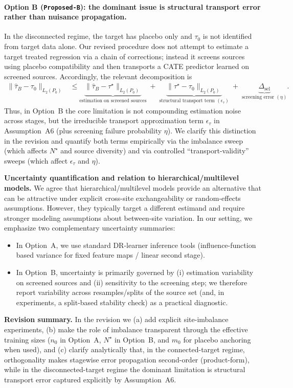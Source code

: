 {\paragraph{Option B (\texttt{Proposed-B}): the dominant issue is structural transport error rather than nuisance propagation.}
In the disconnected regime, the target has placebo only and $\tau_0$ is not identified from target data alone. Our revised procedure does not attempt to estimate a target treated regression via a chain of corrections; instead it screens sources using placebo compatibility and then transports a CATE predictor learned on screened sources. Accordingly, the relevant decomposition is
\begin{align*}
\|\widehat\tau_B-\tau_0\|_{L_2(P_0)}
&\le
\underbrace{\|\widehat\tau_B-\tau^\star\|_{L_2(P_0)}}_{\text{estimation on screened sources}}
\;+\;
\underbrace{\|\tau^\star-\tau_0\|_{L_2(P_0)}}_{\text{structural transport term }(\epsilon_\tau)}
\;+\;
\underbrace{\Delta_{\mathrm{sel}}}_{\text{screening error }(\eta)}.
\end{align*}
Thus, in Option~B the core limitation is not compounding estimation noise across stages, but the irreducible transport approximation term $\epsilon_\tau$ in Assumption~A6 (plus screening failure probability $\eta$). We clarify this distinction in the revision and quantify both terms empirically via the imbalance sweep (which affects $N^\star$ and source diversity) and via controlled ``transport-validity'' sweeps (which affect $\epsilon_\tau$ and $\eta$).

\medskip
\noindent\textbf{Uncertainty quantification and relation to hierarchical/multilevel models.}
We agree that hierarchical/multilevel models provide an alternative that can be attractive under explicit cross-site exchangeability or random-effects assumptions.
However, they typically target a different estimand and require stronger modeling assumptions about between-site variation.
In our setting, we emphasize two complementary uncertainty summaries:
\begin{itemize}
\item In Option~A, we use standard DR-learner inference tools (influence-function based variance for fixed feature maps / linear second stage).
\item In Option~B, uncertainty is primarily governed by (i) estimation variability on screened sources and (ii) sensitivity to the screening step; we therefore report variability across resamples/splits of the source set (and, in experiments, a split-based stability check) as a practical diagnostic.
\end{itemize}

\medskip
\noindent\textbf{Revision summary.}
In the revision we (a) add explicit site-imbalance experiments, (b) make the role of imbalance transparent through the effective training sizes ($n_0$ in Option~A, $N^\star$ in Option~B, and $m_0$ for placebo anchoring when used), and (c) clarify analytically that, in the connected-target regime, orthogonality makes stagewise error propagation second-order (product-form), while in the disconnected-target regime the dominant limitation is structural transport error captured explicitly by Assumption~A6.
}

\clearpage